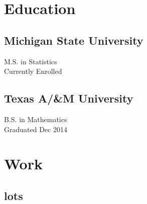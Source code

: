 \documentclass{cavender_cv}
\begin{document}


\begin{minipage}[t]{0.33\textwidth}

\section{Education}
\subsection{Michigan State University}
\vspace{-4pt}
M.S. in Statistics \\
Currently Enrolled

\subsecspace

\subsection{Texas A/&M University}
\vspace{-4pt}
B.S. in Mathematics \\
Graduated Dec 2014

\subsecspace

\section{Work}
\subsection{lots}

\end{minipage}
\end{document}
